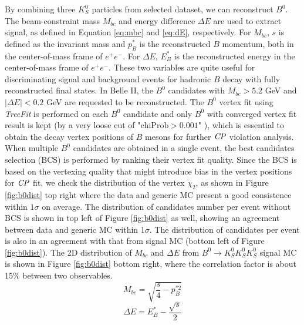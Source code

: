 By combining three $K_S^0$ particles from selected dataset, we can reconstruct $B^0$. The beam-constraint mass $M_{bc}$ and energy difference $\Delta E$ are used to extract signal, as defined in Equation \ref{eq:mbc} and \ref{eq:dE}, respectively. For $M_{bc}$, $s$ is defined as the invariant mass and $p^*_B$ is the reconstructed $B$ momentum, both in the center-of-mass frame of $e^+e^-$. For $\Delta E$, $E^*_B$ is the reconstructed energy in the center-of-mass frame of $e^+e^-$. These two variables are quite useful for discriminating signal and background events for hadronic $B$ decay with fully reconstructed final states.
 In Belle II, the $B^0$ candidates with $M_{bc} > 5.2$ GeV and $|\Delta{E}| < 0.2$ GeV are requested to be reconstructed. The $B^0$ vertex fit using \textit{TreeFit} is performed on each $B^0$ candidate and only $B^0$ with converged vertex fit result is kept (by a very loose cut of "$\text{chiProb} > 0.001$" ), which is essential to obtain the decay vertex positions of $B$ mesons for further $\it{CP}$ violation analysis. When multiple $B^0$ candidates are obtained in a single event, the best candidates selection (BCS) is performed by ranking their vertex fit quality. Since the BCS is based on the vertexing quality that might introduce bias in the vertex positions for $\it{CP}$ fit, we check the distribution of the vertex $\chi_2$, as shown in Figure \ref{fig:b0dist} top right where the data and generic MC present a good consistence within $1\sigma$ on average. The distribution of candidates number per event without BCS is shown in top left of Figure \ref{fig:b0dist} as well, showing an agreement between data and generic MC within 1$\sigma$. The distribution of candidates per event is also in an agreement with that from signal MC (bottom left of Figure \ref{fig:b0dist}). The 2D distribution of $M_{bc}$ and $\Delta E$ from $B^0 \to K_S^0  K_S^0  K_S^0$ signal MC is shown in Figure \ref{fig:b0dist}  bottom right, where the correlation factor is about 15\% between two observables. 
 \begin{equation}\label{eq:mbc}
 M_{bc} = \sqrt{\frac{s}{4}-p^{*2}_B} 
 \end{equation}
 \begin{equation}\label{eq:dE}
 \Delta E = E^*_B - \frac{\sqrt{s}}{2}
 \end{equation}
 
